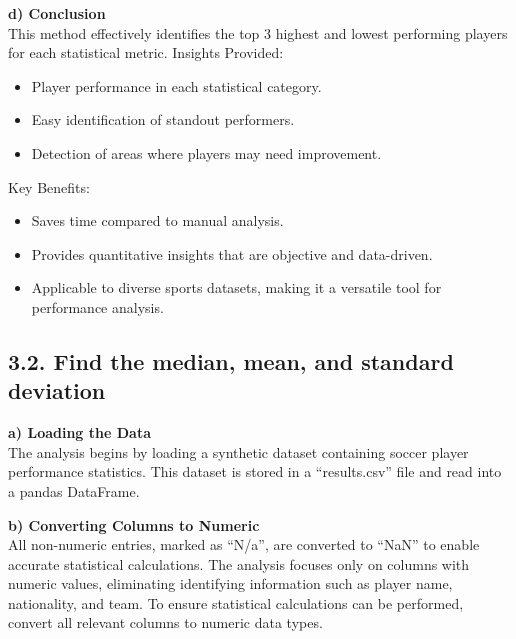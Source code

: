 \documentclass[a4paper,12pt]{article}
\begin{document}
\textbf{d) Conclusion} \\
This method effectively identifies the top 3 highest and lowest performing players for each statistical metric.
Insights Provided:
\begin{itemize}
    \item Player performance in each statistical category.
    \item Easy identification of standout performers.
    \item Detection of areas where players may need improvement.
\end{itemize}

Key Benefits:
\begin{itemize}
    \item Saves time compared to manual analysis.
    \item Provides quantitative insights that are objective and data-driven.
    \item Applicable to diverse sports datasets, making it a versatile tool for performance analysis.
\end{itemize}

\subsection*{\textbf{\Large 3.2. Find the median, mean, and standard deviation}}
\textbf{a) Loading the Data} \\
The analysis begins by loading a synthetic dataset containing soccer player performance statistics. This dataset is stored in a “results.csv” file and read into a pandas DataFrame.

\textbf{b) Converting Columns to Numeric} \\
All non-numeric entries, marked as “N/a”, are converted to “NaN” to enable accurate statistical calculations. The analysis focuses only on columns with numeric values, eliminating identifying information such as player name, nationality, and team. To ensure statistical calculations can be performed, convert all relevant columns to numeric data types.
\end{document}
